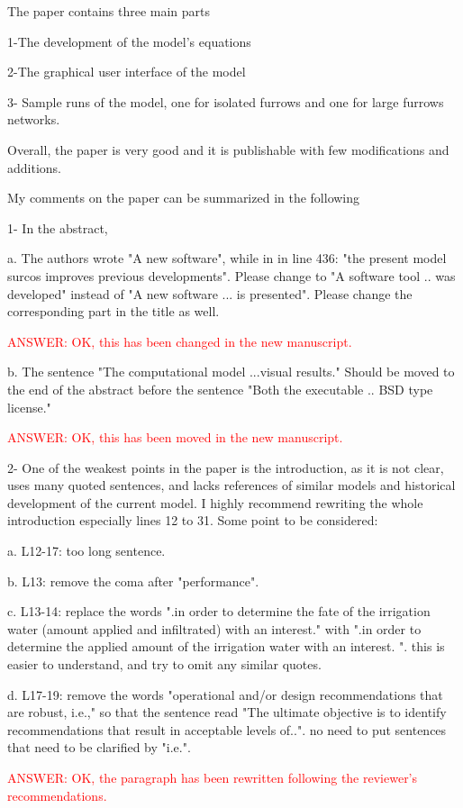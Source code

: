 \documentclass[a4paper]{article}
\begin{document}
The paper contains three main parts

1-The development of the model's equations

2-The graphical user interface of the model

3- Sample runs of the model, one for isolated furrows and one for large furrows networks.

Overall, the paper is very good and it is publishable with few modifications and additions.

My comments on the paper can be summarized in the following

1- In the abstract,

a. The authors wrote "A new software", while in in line 436: "the present model surcos improves previous developments". Please change to "A software tool .. was developed" instead of "A new software ... is presented". Please change the corresponding part in the title as well.

\textcolor{red}{ANSWER: OK, this has been changed in the new manuscript.}
 
b. The sentence "The computational model ...visual results." Should be moved to the end of the abstract before the sentence "Both the executable .. BSD type license."

\textcolor{red}{ANSWER: OK, this has been moved in the new manuscript.}

2- One of the weakest points in the paper is the introduction, as it is not clear, uses many quoted sentences, and lacks references of similar models and historical development of the current model. I highly recommend rewriting the whole introduction especially lines 12 to 31. Some point to be considered:

a. L12-17: too long sentence.

b. L13: remove the coma after "performance".

c. L13-14: replace the words ".in order to determine the fate of the irrigation water (amount applied and infiltrated) with an interest." with ".in order to determine the applied amount of the irrigation water with an interest. ". this is easier to understand, and try to omit any similar quotes.

d. L17-19: remove the words "operational and/or design recommendations that are robust, i.e.," so that the sentence read "The ultimate objective is to identify recommendations that result in acceptable levels of..". no need to put sentences that need to be clarified by "i.e.".

\textcolor{red}{ANSWER: OK, the paragraph has been rewritten following the
reviewer's recommendations.}
\end{document}
